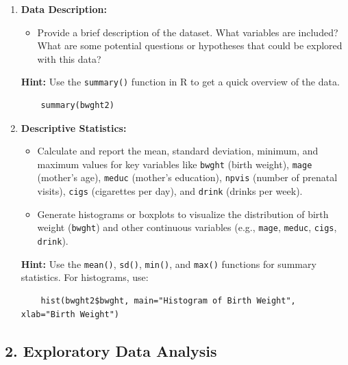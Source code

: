 \documentclass[11pt,a4paper,english]{article}
\begin{document}
\begin{enumerate}[itemsep=-0.5ex]
    \item \textbf{Data Description:}
    \begin{itemize}[itemsep=-0.5ex]
        \item Provide a brief description of the dataset. What variables are included? What are some potential questions or hypotheses that could be explored with this data?
        \end{itemize}
        \textbf{Hint:} Use the \texttt{summary()} function in R to get a quick overview of the data.
        
    \begin{verbatim}
    summary(bwght2)
    \end{verbatim}
    
    
    \item \textbf{Descriptive Statistics:}
    \begin{itemize}[itemsep=-0.5ex]
        \item Calculate and report the mean, standard deviation, minimum, and maximum values for key variables like \texttt{bwght} (birth weight), \texttt{mage} (mother’s age), \texttt{meduc} (mother’s education), \texttt{npvis} (number of prenatal visits), \texttt{cigs} (cigarettes per day), and \texttt{drink} (drinks per week).
        \item Generate histograms or boxplots to visualize the distribution of birth weight (\texttt{bwght}) and other continuous variables (e.g., \texttt{mage}, \texttt{meduc}, \texttt{cigs}, \texttt{drink}).
    \end{itemize}
    \textbf{Hint:} Use the \texttt{mean()}, \texttt{sd()}, \texttt{min()}, and \texttt{max()} functions for summary statistics. For histograms, use:
    \begin{verbatim}
    hist(bwght2$bwght, main="Histogram of Birth Weight", xlab="Birth Weight")
    \end{verbatim}
\end{enumerate}
    \subsection*{2. Exploratory Data Analysis}
\end{document}
